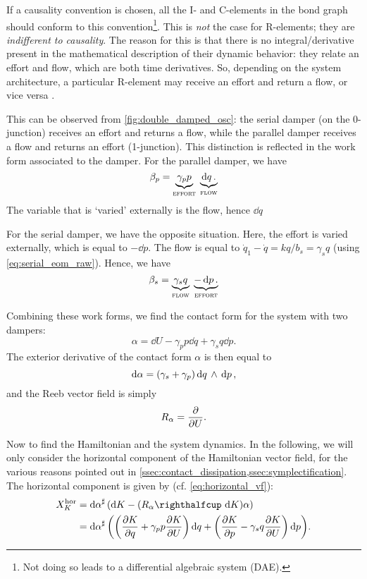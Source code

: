 If a causality convention is chosen, all the I- and C-elements in the bond graph should conform to this convention\footnote{Not doing so leads to a differential algebraic system (DAE).}. This is \emph{not} the case for R-elements; they are \emph{indifferent to causality}. The reason for this is that there is no integral/derivative present in the mathematical description of their dynamic behavior: they relate an effort and flow, which are both time derivatives. So, depending on the system architecture, a particular R-element may receive an effort and return a flow, or vice versa \cite{Borutzky2010}.

This can be observed from \cref{fig:double_damped_osc}: the serial damper (on the 0-junction) receives an effort and returns a flow, while the parallel damper receives a flow and returns an effort (1-junction). This distinction is reflected in the work form associated to the damper. For the parallel damper, we have
$$ \beta_p = \underbrace{\gamma_p p}_\text{\textsc{effort}} \; \underbrace{\dd{q}.}_\text{\textsc{flow}} $$
The variable that is `varied' externally is the flow, hence $\dd{q}$ 

For the serial damper, we have the opposite situation. Here, the effort is varied externally, which is equal to $-\dd{p}$. The flow is equal to $\dot{q}_1 - \dot{q} = kq/b_s = \gamma_s q$ (using \cref{eq:serial_eom_raw}). Hence, we have
$$ \beta_s = \underbrace{\gamma_s q}_\text{\textsc{flow}} \; \underbrace{-\dd{p}.}_\text{\textsc{effort}}$$

Combining these work forms, we find the contact form for the system with two dampers:
\begin{equation}
    \alpha = \dd{U} - \gamma_p p\dd{q} + \gamma_s q \dd{p}.
    \label{eq:serial_dho_contact_form}
\end{equation}
The exterior derivative of the contact form $\alpha$ is then equal to
$$ \dd{\alpha} = (\gamma_s + \gamma_p)  \dd{q}\,\wedge\,\dd{p} , $$
and the Reeb vector field is simply
$$ R_\alpha = \pdv{}{U}. $$

Now to find the Hamiltonian and the system dynamics. In the following, we will only consider the horizontal component of the Hamiltonian vector field, for the various reasons pointed out in \cref{ssec:contact_dissipation,ssec:symplectification}. The horizontal component is given by (cf. \cref{eq:horizontal_vf}):
\begin{equation}
    \begin{split}
        X^\text{hor}_K &= \fromDual{\dd{\alpha}}\qty(\dd{K} - (\intpr{R_\alpha}{\dd{K}})\alpha) \\
                       &= \fromDual{\dd{\alpha}}\qty(\qty(\pdv{K}{q} + \gamma_p p \pdv{K}{U})\dd{q} + \qty(\pdv{K}{p} - \gamma_s q \pdv{K}{U})\dd{p}).
    \end{split}
\end{equation}

